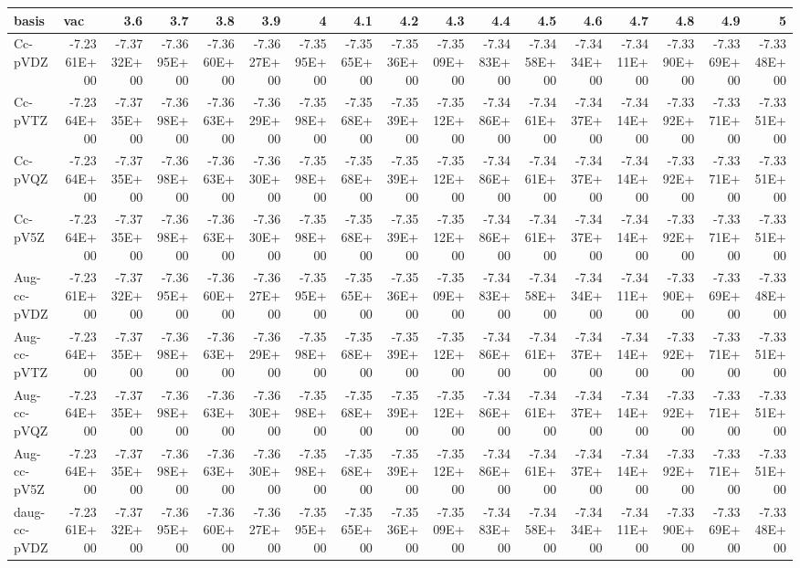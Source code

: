 \documentclass[../master_thesis.tex]{subfiles}
\begin{document}
\begin{sidewaystable}[h]
{{\begin{tabular}{|l|r|r|r|r|r|r|r|r|r|r|r|r|r|r|r|r|}
\hline
basis & \multicolumn{1}{l|}{vac} & 3.6 & 3.7 & 3.8 & 3.9 & 4 & 4.1 & 4.2 & 4.3 & 4.4 & 4.5 & 4.6 & 4.7 & 4.8 & 4.9 & 5 \\ \hline
Cc-pVDZ & -7.2361E+00 & -7.3732E+00 & -7.3695E+00 & -7.3660E+00 & -7.3627E+00 & -7.3595E+00 & -7.3565E+00 & -7.3536E+00 & -7.3509E+00 & -7.3483E+00 & -7.3458E+00 & -7.3434E+00 & -7.3411E+00 & -7.3390E+00 & -7.3369E+00 & -7.3348E+00 \\ \hline
Cc-pVTZ & -7.2364E+00 & -7.3735E+00 & -7.3698E+00 & -7.3663E+00 & -7.3629E+00 & -7.3598E+00 & -7.3568E+00 & -7.3539E+00 & -7.3512E+00 & -7.3486E+00 & -7.3461E+00 & -7.3437E+00 & -7.3414E+00 & -7.3392E+00 & -7.3371E+00 & -7.3351E+00 \\ \hline
Cc-pVQZ & -7.2364E+00 & -7.3735E+00 & -7.3698E+00 & -7.3663E+00 & -7.3630E+00 & -7.3598E+00 & -7.3568E+00 & -7.3539E+00 & -7.3512E+00 & -7.3486E+00 & -7.3461E+00 & -7.3437E+00 & -7.3414E+00 & -7.3392E+00 & -7.3371E+00 & -7.3351E+00 \\ \hline
Cc-pV5Z & -7.2364E+00 & -7.3735E+00 & -7.3698E+00 & -7.3663E+00 & -7.3630E+00 & -7.3598E+00 & -7.3568E+00 & -7.3539E+00 & -7.3512E+00 & -7.3486E+00 & -7.3461E+00 & -7.3437E+00 & -7.3414E+00 & -7.3392E+00 & -7.3371E+00 & -7.3351E+00 \\ \hline
Aug-cc-pVDZ & -7.2361E+00 & -7.3732E+00 & -7.3695E+00 & -7.3660E+00 & -7.3627E+00 & -7.3595E+00 & -7.3565E+00 & -7.3536E+00 & -7.3509E+00 & -7.3483E+00 & -7.3458E+00 & -7.3434E+00 & -7.3411E+00 & -7.3390E+00 & -7.3369E+00 & -7.3348E+00 \\ \hline
Aug-cc-pVTZ & -7.2364E+00 & -7.3735E+00 & -7.3698E+00 & -7.3663E+00 & -7.3629E+00 & -7.3598E+00 & -7.3568E+00 & -7.3539E+00 & -7.3512E+00 & -7.3486E+00 & -7.3461E+00 & -7.3437E+00 & -7.3414E+00 & -7.3392E+00 & -7.3371E+00 & -7.3351E+00 \\ \hline
Aug-cc-pVQZ & -7.2364E+00 & -7.3735E+00 & -7.3698E+00 & -7.3663E+00 & -7.3630E+00 & -7.3598E+00 & -7.3568E+00 & -7.3539E+00 & -7.3512E+00 & -7.3486E+00 & -7.3461E+00 & -7.3437E+00 & -7.3414E+00 & -7.3392E+00 & -7.3371E+00 & -7.3351E+00 \\ \hline
Aug-cc-pV5Z & -7.2364E+00 & -7.3735E+00 & -7.3698E+00 & -7.3663E+00 & -7.3630E+00 & -7.3598E+00 & -7.3568E+00 & -7.3539E+00 & -7.3512E+00 & -7.3486E+00 & -7.3461E+00 & -7.3437E+00 & -7.3414E+00 & -7.3392E+00 & -7.3371E+00 & -7.3351E+00 \\ \hline
daug-cc-pVDZ & -7.2361E+00 & -7.3732E+00 & -7.3695E+00 & -7.3660E+00 & -7.3627E+00 & -7.3595E+00 & -7.3565E+00 & -7.3536E+00 & -7.3509E+00 & -7.3483E+00 & -7.3458E+00 & -7.3434E+00 & -7.3411E+00 & -7.3390E+00 & -7.3369E+00 & -7.3348E+00 \\ \hline

\end{tabular}}}
\end{sidewaystable}
\end{document}
